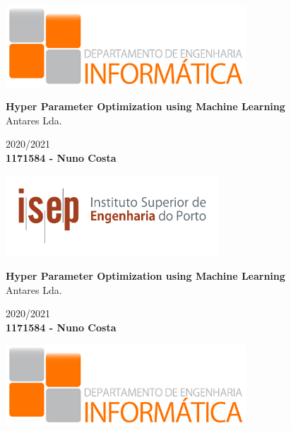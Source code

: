 \documentclass[10pt,titlepage]{article}
\makeatletter
\newcommand\frontmatter{%
    \cleardoublepage
  \pagenumbering{roman}}
\makeatother
\begin{document}
\frontmatter
\begin{titlepage}
   \begin{center}
        \vspace*{1cm}

        \includegraphics[width=8.9916cm]{DEI_logo.png}

        \vfill
        \textbf{\huge Hyper Parameter Optimization using Machine Learning}
        \vspace{0.3cm}
        \\{\large Antares Lda.}
	    \vspace{0.7cm}
        
        {\Large 2020/2021}
        \vspace{1.6cm}
        \\\textbf{\large 1171584 - Nuno Costa}

        \vfill

        \includegraphics[width=8.001cm]{ISEP_logo.png}

    \newpage

       \vspace*{1cm}

        \textbf{\huge Hyper Parameter Optimization using Machine Learning}
        \vspace{0.5cm}
        \\{\large Antares Lda.}
        \vspace{1cm}
        
        {\Large 2020/2021}
        \vspace{1.6cm}
        \\\textbf{\large 1171584 - Nuno Costa}

        \vfill

        \includegraphics[width=8.9916cm]{DEI_logo.png}


\end{center}
\end{titlepage}
\end{document}

